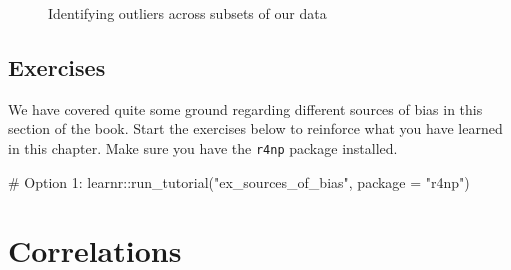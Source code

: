 \documentclass[
  letterpaper,
  DIV=11,
  numbers=noendperiod]{scrreprt}
\newenvironment{Shaded}{\begin{snugshade}}{\end{snugshade}}
\newcommand{\AttributeTok}[1]{\textcolor[rgb]{0.40,0.45,0.13}{#1}}
\newcommand{\CommentTok}[1]{\textcolor[rgb]{0.37,0.37,0.37}{#1}}
\newcommand{\FunctionTok}[1]{\textcolor[rgb]{0.28,0.35,0.67}{#1}}
\newcommand{\NormalTok}[1]{\textcolor[rgb]{0.00,0.23,0.31}{#1}}
\newcommand{\SpecialCharTok}[1]{\textcolor[rgb]{0.37,0.37,0.37}{#1}}
\newcommand{\StringTok}[1]{\textcolor[rgb]{0.13,0.47,0.30}{#1}}
\begin{document}
\begin{figure}


\caption{\label{fig-final-plot-outliers}Identifying outliers across
subsets of our data}

\end{figure}%

\section{Exercises}\label{sec-exercises-sources-of-bias}

We have covered quite some ground regarding different sources of bias in
this section of the book. Start the exercises below to reinforce what
you have learned in this chapter. Make sure you have the \texttt{r4np}
package installed.

\begin{Shaded}
\begin{Highlighting}[]
\CommentTok{\# Option 1:}
\NormalTok{learnr}\SpecialCharTok{::}\FunctionTok{run\_tutorial}\NormalTok{(}\StringTok{"ex\_sources\_of\_bias"}\NormalTok{, }\AttributeTok{package =} \StringTok{"r4np"}\NormalTok{)}
\end{Highlighting}
\end{Shaded}


\chapter{Correlations}\label{sec-correlations}
\end{document}
